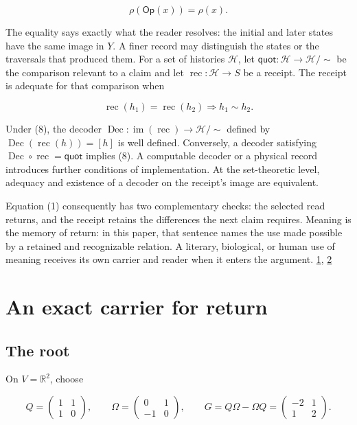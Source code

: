 \[
\rho(\mathsf{Op}(x))=\rho(x).
\tag{7}
\]

The equality says exactly what the reader resolves: the initial and later states have the same image in \(Y\). A finer record may distinguish the states or the traversals that produced them. For a set of histories \(\mathcal H\), let \(\mathsf{quot}:\mathcal H\to\mathcal H/{\sim}\) be the comparison relevant to a claim and let \(\operatorname{rec}:\mathcal H\to S\) be a receipt. The receipt is adequate for that comparison when

\[
\operatorname{rec}(h_1)=\operatorname{rec}(h_2)
\Longrightarrow h_1\sim h_2.
\tag{8}
\]

Under (8), the decoder \(\operatorname{Dec}:\operatorname{im}(\operatorname{rec})\to\mathcal H/{\sim}\) defined by \(\operatorname{Dec}(\operatorname{rec}(h))=[h]\) is well defined. Conversely, a decoder satisfying \(\operatorname{Dec}\circ\operatorname{rec}=\mathsf{quot}\) implies (8). A computable decoder or a physical record introduces further conditions of implementation. At the set-theoretic level, adequacy and existence of a decoder on the receipt's image are equivalent.

Equation (1) consequently has two complementary checks: the selected read returns, and the receipt retains the differences the next claim requires. Meaning is the memory of return: in this paper, that sentence names the use made possible by a retained and recognizable relation. A literary, biological, or human use of meaning receives its own carrier and reader when it enters the argument. \href{https://github.com/Coppalini-Architecture/coppalini-architecture/blob/9b7122ca5c3712c2c294e2bc5097276d0ba9817b/papers/language-mechanics/000-language-mechanics/language-mechanics-000-v0.2.1.pdf}{1}, \href{https://doi.org/10.5281/zenodo.23697265}{2}

\hypertarget{an-exact-carrier-for-return}{%
\section{An exact carrier for return}\label{an-exact-carrier-for-return}}

\hypertarget{the-root}{%
\subsection{The root}\label{the-root}}

On \(V=\mathbb R^2\), choose

\[
Q=\begin{pmatrix}1&1\\[2pt]1&0\end{pmatrix},
\qquad
\Omega=\begin{pmatrix}0&1\\[2pt]-1&0\end{pmatrix},
\qquad
G=Q\Omega-\Omega Q
=\begin{pmatrix}-2&1\\[2pt]1&2\end{pmatrix}.
\tag{9}
\]

